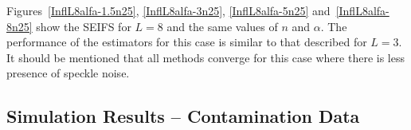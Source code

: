 \documentclass[twocolumn]{svjour3}
\begin{document}
Figures~\ref{InflL8alfa-1.5n25}, \ref{InflL8alfa-3n25}, \ref{InflL8alfa-5n25} and~\ref{InflL8alfa-8n25} show the SEIFS for $L=8$ and the same values of $n$ and $\alpha$. 
The performance of the estimators for this case is similar to that described for $L=3$. 
It should be mentioned that all methods converge for this case where there is less presence of speckle noise.


\subsection{Simulation Results -- Contamination Data}
\label{CasesCont}

%
%
%
%
%
\end{document}
